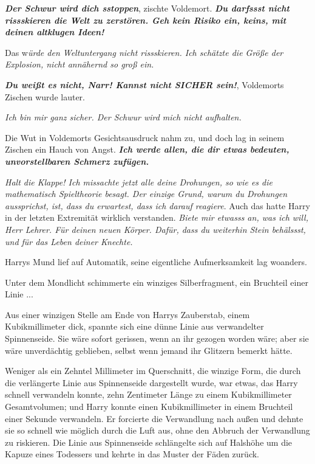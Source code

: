 \glqq{}\textbf{\emph{Der Schwur wird dich sstoppen}}\grqq{}, zischte Voldemort.
\glqq{}\textbf{\emph{Du darfssst nicht rissskieren die Welt zu zerstören. Geh
kein Risiko ein, keins, mit deinen altklugen Ideen!}}\grqq{}

\glqq{}Das w\emph{ürde den Weltuntergang nicht rissskieren. Ich schätzte die
Größe der Explosion, nicht annähernd so groß ein.}\grqq{}

\glqq{}\textbf{\emph{Du weißt es nicht, Narr! Kannst nicht SICHER sein!}}\grqq{},
Voldemorts Zischen wurde lauter.

\glqq{}\emph{Ich bin mir ganz sicher. Der Schwur wird mich nicht
aufhalten.}\grqq{}

Die Wut in Voldemorts Gesichtsausdruck nahm zu, und doch lag in seinem Zischen
ein Hauch von Angst. \glqq{}\textbf{\emph{Ich werde allen, die dir etwas
bedeuten, unvorstellbaren Schmerz zufügen.}}\grqq{}

\glqq{}\emph{Halt die Klappe! Ich missachte jetzt alle deine Drohungen, so wie es
die mathematisch Spieltheorie besagt. Der einzige Grund, warum du Drohungen
aussprichst, ist, dass du erwartest, dass ich darauf reagiere}.\grqq{} Auch das
hatte Harry in der letzten Extremität wirklich verstanden. \glqq{}\emph{Biete mir
etwasss an, was ich will, Herr Lehrer. Für deinen neuen Körper. Dafür, dass du
weiterhin Stein behälssst, und für das Leben deiner Knechte.}\grqq{}

Harrys Mund lief auf Automatik, seine eigentliche Aufmerksamkeit lag woanders.

Unter dem Mondlicht schimmerte ein winziges Silberfragment, ein Bruchteil einer
Linie ...

Aus einer winzigen Stelle am Ende von Harrys Zauberstab, einem Kubikmillimeter
dick, spannte sich eine dünne Linie aus verwandelter Spinnenseide. Sie wäre
sofort gerissen, wenn an ihr gezogen worden wäre; aber sie wäre unverdächtig
geblieben, selbst wenn jemand ihr Glitzern bemerkt hätte.

Weniger als ein Zehntel Millimeter im Querschnitt, die winzige Form, die durch
die verlängerte Linie aus Spinnenseide dargestellt wurde, war etwas, das Harry
schnell verwandeln konnte, zehn Zentimeter Länge zu einem Kubikmillimeter
Gesamtvolumen; und Harry konnte einen Kubikmillimeter in einem Bruchteil einer
Sekunde verwandeln. Er forcierte die Verwandlung nach außen und dehnte sie so
schnell wie möglich durch die Luft aus, ohne den Abbruch der Verwandlung zu
riskieren. Die Linie aus Spinnenseide schlängelte sich auf Halshöhe um die
Kapuze eines Todessers und kehrte in das Muster der Fäden zurück.

